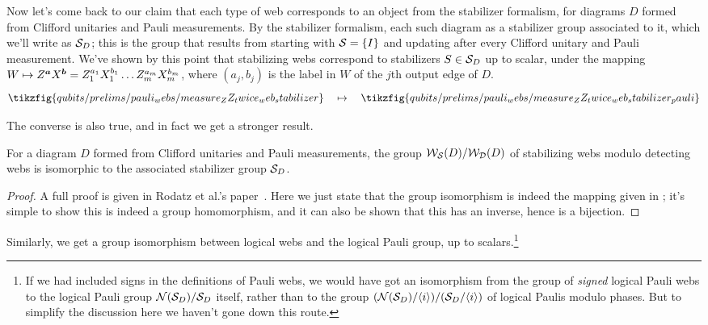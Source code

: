 Now let's come back to our claim that each type of web corresponds to an object from the stabilizer formalism,
for diagrams $D$ formed from Clifford unitaries and Pauli measurements.
By the stabilizer formalism, each such diagram as a stabilizer group associated to it, which we'll write as $\mathcal{S}_D$; this is the group that results from starting with $\mathcal{S} = \{I\}$ and updating after every Clifford unitary and Pauli measurement.
We've shown by this point that stabilizing webs correspond to stabilizers $S \in \mathcal{S}_D$ up to scalar, under the mapping $W \mapsto Z^{\boldsymbol{a}}X^{\boldsymbol{b}} = Z_1^{a_1} X_1^{b_1} \ldots Z_m^{a_m} X_m^{b_m}$, where $(a_j, b_j)$ is the label in $W$ of the $j$th output edge of $D$.
\begin{equation}\label{eq:stabilizer_web_to_pauli_map}
    \tikzfig{qubits/prelims/pauli_webs/measure_ZZ_twice_web_stabilizer}
    \quad \mapsto \quad
    \tikzfig{qubits/prelims/pauli_webs/measure_ZZ_twice_web_stabilizer_pauli}
\end{equation}

The converse is also true, and in fact we get a stronger result.

\begin{proposition}\label{prop:stabilizer_webs_iso}
    \cite[Proposition A.3]{rodatz2024floquetifying} For a diagram $D$ formed from Clifford unitaries and Pauli measurements, the group $\mathcal{W}_{\mathcal{S}}(D)/\mathcal{W}_{\mathcal{D}}(D)$ of stabilizing webs modulo detecting webs is isomorphic to the associated stabilizer group $\mathcal{S}_D$.
    \begin{proof}
        A full proof is given in Rodatz et al.'s paper~\cite{rodatz2024floquetifying}.
        Here we just state that the group isomorphism is indeed the mapping given in ; it's simple to show this is indeed a group homomorphism, and it can also be shown that this has an inverse, hence is a bijection.
    \end{proof}
\end{proposition}

Similarly, we get a group isomorphism between logical webs and the logical Pauli group, up to scalars.\footnote{If we had included signs in the definitions of Pauli webs, we would have got an isomorphism from the group of \textit{signed} logical Pauli webs to the logical Pauli group $\mathcal{N}(\mathcal{S}_D)/\mathcal{S}_D$ itself, rather than to the group $(\mathcal{N}(\mathcal{S}_D)/\langle i \rangle)/(\mathcal{S}_D/\langle i \rangle)$ of logical Paulis modulo phases.
But to simplify the discussion here we haven't gone down this route.}

